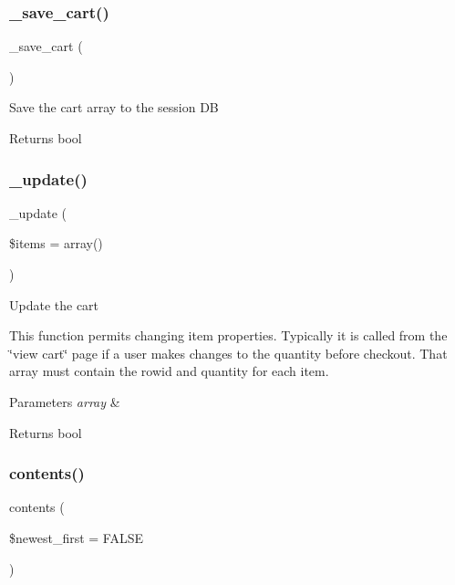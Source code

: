 \subsubsection{\texorpdfstring{\+\_\+save\+\_\+cart()}{\_save\_cart()}}
{\footnotesize\ttfamily \+\_\+save\+\_\+cart (\begin{DoxyParamCaption}{ }\end{DoxyParamCaption})\hspace{0.3cm}{\ttfamily [protected]}}

Save the cart array to the session DB

\begin{DoxyReturn}{Returns}
bool 
\end{DoxyReturn}
\mbox{\label{class_c_i___cart_ac7b19afff2357d4b9e926ee2df1f3e65}} 
\subsubsection{\texorpdfstring{\+\_\+update()}{\_update()}}
{\footnotesize\ttfamily \+\_\+update (\begin{DoxyParamCaption}\item[{}]{\$items = {\ttfamily array()} }\end{DoxyParamCaption})\hspace{0.3cm}{\ttfamily [protected]}}

Update the cart

This function permits changing item properties. Typically it is called from the \char`\"{}view cart\char`\"{} page if a user makes changes to the quantity before checkout. That array must contain the rowid and quantity for each item.


\begin{DoxyParams}{Parameters}
{\em array} & \\
\hline
\end{DoxyParams}
\begin{DoxyReturn}{Returns}
bool 
\end{DoxyReturn}
\mbox{\label{class_c_i___cart_a9d7b86f0ac41c6301e6373644011d87f}} 
\subsubsection{\texorpdfstring{contents()}{contents()}}
{\footnotesize\ttfamily contents (\begin{DoxyParamCaption}\item[{}]{\$newest\+\_\+first = {\ttfamily FALSE} }\end{DoxyParamCaption})}

